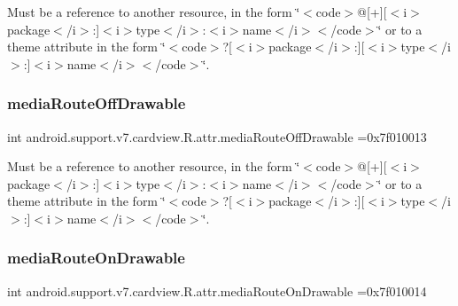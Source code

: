 Must be a reference to another resource, in the form \char`\"{}$<$code$>$@\mbox{[}+\mbox{]}\mbox{[}$<$i$>$package$<$/i$>$\+:\mbox{]}$<$i$>$type$<$/i$>$\+:$<$i$>$name$<$/i$>$$<$/code$>$\char`\"{} or to a theme attribute in the form \char`\"{}$<$code$>$?\mbox{[}$<$i$>$package$<$/i$>$\+:\mbox{]}\mbox{[}$<$i$>$type$<$/i$>$\+:\mbox{]}$<$i$>$name$<$/i$>$$<$/code$>$\char`\"{}. \mbox{\label{classandroid_1_1support_1_1v7_1_1cardview_1_1R_1_1attr_a92e8c10b8fe57bcb21cfec42ed6294f8}} 
\subsubsection{\texorpdfstring{media\+Route\+Off\+Drawable}{mediaRouteOffDrawable}}
{\footnotesize\ttfamily int android.\+support.\+v7.\+cardview.\+R.\+attr.\+media\+Route\+Off\+Drawable =0x7f010013\hspace{0.3cm}{\ttfamily [static]}}

Must be a reference to another resource, in the form \char`\"{}$<$code$>$@\mbox{[}+\mbox{]}\mbox{[}$<$i$>$package$<$/i$>$\+:\mbox{]}$<$i$>$type$<$/i$>$\+:$<$i$>$name$<$/i$>$$<$/code$>$\char`\"{} or to a theme attribute in the form \char`\"{}$<$code$>$?\mbox{[}$<$i$>$package$<$/i$>$\+:\mbox{]}\mbox{[}$<$i$>$type$<$/i$>$\+:\mbox{]}$<$i$>$name$<$/i$>$$<$/code$>$\char`\"{}. \mbox{\label{classandroid_1_1support_1_1v7_1_1cardview_1_1R_1_1attr_a3d42a901a73d757075b7fc2b208cb664}} 
\subsubsection{\texorpdfstring{media\+Route\+On\+Drawable}{mediaRouteOnDrawable}}
{\footnotesize\ttfamily int android.\+support.\+v7.\+cardview.\+R.\+attr.\+media\+Route\+On\+Drawable =0x7f010014\hspace{0.3cm}{\ttfamily [static]}}

